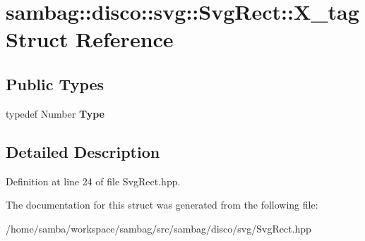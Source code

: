 \hypertarget{structsambag_1_1disco_1_1svg_1_1_svg_rect_1_1_x__tag}{
\section{sambag::disco::svg::SvgRect::X\_\-tag Struct Reference}
\label{structsambag_1_1disco_1_1svg_1_1_svg_rect_1_1_x__tag}
}
\subsection*{Public Types}
\begin{DoxyCompactItemize}
\item 
\hypertarget{structsambag_1_1disco_1_1svg_1_1_svg_rect_1_1_x__tag_af60b12498d90146189a7899820f7515b}{
typedef Number {\bfseries Type}}
\label{structsambag_1_1disco_1_1svg_1_1_svg_rect_1_1_x__tag_af60b12498d90146189a7899820f7515b}

\end{DoxyCompactItemize}


\subsection{Detailed Description}


Definition at line 24 of file SvgRect.hpp.



The documentation for this struct was generated from the following file:\begin{DoxyCompactItemize}
\item 
/home/samba/workspace/sambag/src/sambag/disco/svg/SvgRect.hpp\end{DoxyCompactItemize}
